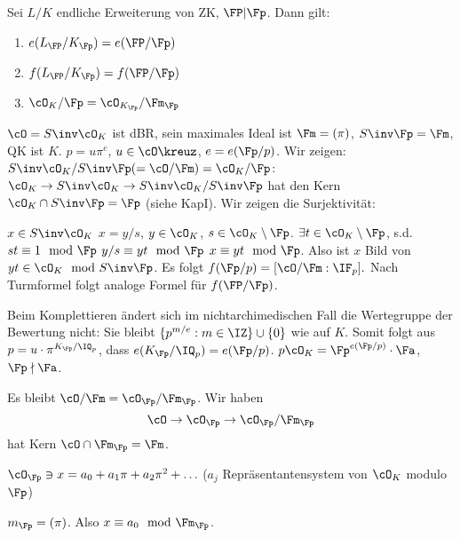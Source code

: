 \renewcommand{\lecdate}{03.02.2015}

\begin{Fakt}
Sei $L/K$ endliche Erweiterung von ZK, $\FP|\Fp$. Dann gilt:
\begin{enumerate}
 \item $e(L_\FP/K_\Fp)=e(\FP/\Fp)$
 \item $f(L_\FP/K_\Fp)=f(\FP/\Fp)$
 \item $\cO_K/\Fp=\cO_{K_\Fp}/\Fm_\Fp$
\end{enumerate}
\end{Fakt}

\begin{Beweis}
 $\cO=S\inv\cO_K$ ist dBR, sein maximales Ideal ist $\Fm=(\pi)$, $S\inv\Fp=\Fm$, QK ist $K$.
 $p=u\pi^e$, $u\in\cO\kreuz$, $e=e(\Fp/p)$. Wir zeigen: $S\inv\cO_K/S\inv\Fp (=\cO/\Fm)=\cO_K/\Fp$:
 $\cO_K\rightarrow S\inv\cO_K \rightarrow S\inv\cO_K/S\inv\Fp$ hat den Kern $\cO_K\cap S\inv\Fp=\Fp$ (siehe KapI). Wir zeigen die Surjektivität:
 
 $x\in S\inv\cO_K$ \folge $x=y/s$, $y\in\cO_K$, $s\in\cO_K\setminus \Fp$. $\exists t\in \cO_K\setminus\Fp$, s.d. $st\equiv 1\mod{\Fp}$ \folge $y/s\equiv yt\mod{\Fp}$ \folge $x\equiv yt\mod{\Fp}$. Also ist $x$ Bild von $yt\in\cO_K \mod{S\inv\Fp}$. Es folgt $f(\Fp/p)=[\cO/\Fm:\IF_p].$ Nach Turmformel folgt analoge Formel für $f(\FP/\Fp)$.
 
 Beim Komplettieren ändert sich im nichtarchimedischen Fall die Wertegruppe der Bewertung nicht: Sie bleibt $\{ p^{m/e} : m\in\IZ\}\cup\{ 0\}$ wie auf $K$. Somit folgt aus $p=u\cdot \pi^{K_\Fp/\IQ_p}$, dass $e(K_\Fp/\IQ_p)=e(\Fp/p)$. $p\cO_K=\Fp^{e(\Fp/p)}\cdot\Fa$, $\Fp\nmid\Fa$.
 
 Es bleibt $\cO/\Fm=\cO_\Fp/\Fm_\Fp$. Wir haben \[ \cO\rightarrow \cO_\Fp \rightarrow \cO_\Fp/\Fm_\Fp\]
 hat Kern $\cO\cap\Fm_\Fp=\Fm$.
 
 $\cO_\Fp \ni x = a_0+a_1\pi+a_2\pi^2+\ldots$ ($a_j$ Repräsentantensystem von $\cO_K$ modulo $\Fp$)
 
 $m_\Fp=(\pi)$. Also $x\equiv a_0\mod{\Fm_\Fp}$.
\end{Beweis}

